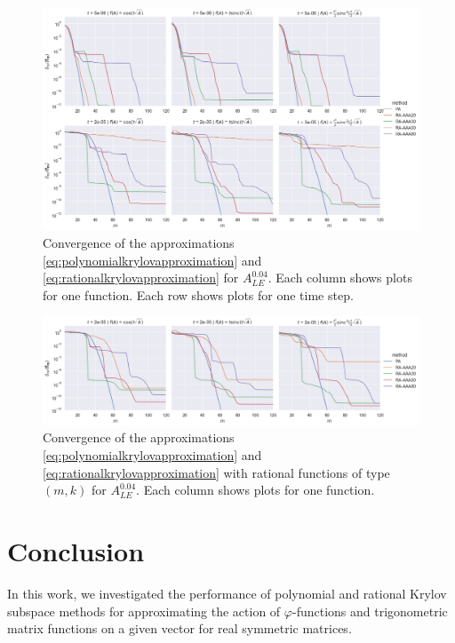 \begin{figure}[h]
    \centering
    \includegraphics[width=.9\textwidth]{img/trigonometric/cnvg_h4e-02_methods_ts.png}
    \caption{
        Convergence of the approximations \eqref{eq:polynomialkrylovapproximation}
        and \eqref{eq:rationalkrylovapproximation} for $A_{LE}^{0.04}$. Each column
        shows plots for one function. Each row shows plots for one time step.
        }
        \label{fig:trigonometricconvergences}
\end{figure}

\begin{figure}[h]
    \centering
    \includegraphics[width=.9\textwidth]{img/trigonometric/cnvg_h4e-02_methods_ts_mk.png}
    \caption{
        Convergence of the approximations \eqref{eq:polynomialkrylovapproximation}
        and \eqref{eq:rationalkrylovapproximation} with rational functions of type
        $(m, k)$ for $A_{LE}^{0.04}$.
        Each column shows plots for one function.
        }
        \label{fig:trigonometricconvergences_mk}
\end{figure}

\FloatBarrier

\section{Conclusion}
\label{sec:conclusion}

In this work, we investigated the performance of polynomial and rational Krylov subspace
methods for approximating the action of $\varphi$-functions and trigonometric matrix
functions on a given vector for real symmetric matrices.

